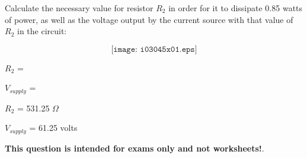 

Calculate the necessary value for resistor $R_2$ in order for it to dissipate 0.85 watts of power, as well as the voltage output by the current source with that value of $R_2$ in the circuit:

$$\texttt{[image: i03045x01.eps]}$$

$R_2$ = 

\vskip 10pt

$V_{supply}$ = 

\vskip 10pt







$R_2$ = 531.25 $\Omega$

\vskip 10pt

$V_{supply}$ = 61.25 volts








{\bf This question is intended for exams only and not worksheets!}.


